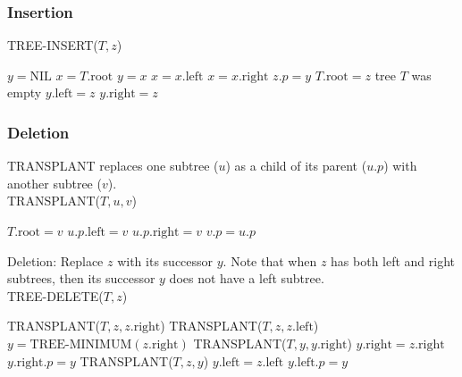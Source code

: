 \documentclass[12pt]{article}
\begin{document}
\subsubsection*{Insertion}

TREE-INSERT($T,z$)
\begin{algorithmic}[1]
\State $y = \text {NIL}$
\State $x = T.\text{root}$
	\State $y = x$
        	\State $x = x.\text{left}$
        \Else
        	\State $x = x.\text{right}$
        \EndIf
\EndWhile
\State $z.p = y$
	\State $T.\text{root} = z$
        \Comment tree $T$ was empty
	\State $y.\text{left} = z$
\Else
	\State $y.\text{right} = z$
\EndIf
\end{algorithmic}

\subsubsection{Deletion}

TRANSPLANT replaces one subtree ($u$) as a child of its parent ($u.p$) with another subtree ($v$). \\

TRANSPLANT($T,u,v$)
\begin{algorithmic}[1]
	\State $T.\text{root} = v$
	\State $u.p.\text{left} = v$
\Else
	\State $u.p.\text{right} = v$
\EndIf
{}
	\State $v.p = u.p$
\EndIf
\end{algorithmic}

Deletion: Replace $z$ with its successor $y$. Note that when $z$ has both left and right subtrees, then its successor $y$ does not have a left subtree. \\

TREE-DELETE($T,z$)
\begin{algorithmic}[1]
	\State TRANSPLANT($T,z,z.\text{right}$)
	\State TRANSPLANT($T,z,z.\text{left}$)
\Else
	\State $y = \text {TREE-MINIMUM}(z.\text{right})$
		\State TRANSPLANT($T,y,y.\text{right}$)
                \State $y.\text{right} = z.\text{right}$
                \State $y.\text{right}.p = y$
        \EndIf
        \State TRANSPLANT($T,z,y$)
        \State $y.\text{left} = z.\text{left}$
        \State $y.\text{left}.p = y$
\EndIf
\end{algorithmic}
\end{document}
